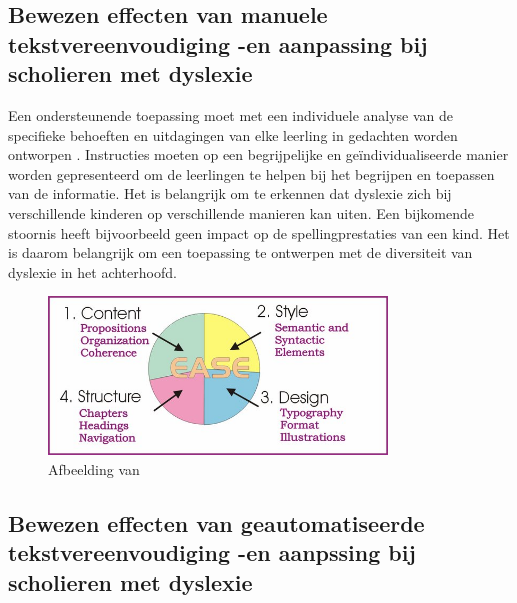 

\subsection{Bewezen effecten van manuele tekstvereenvoudiging -en aanpassing bij scholieren met dyslexie}

Een ondersteunende toepassing moet met een individuele analyse van de specifieke behoeften en uitdagingen van elke leerling in gedachten worden ontworpen \autocite{Gooding2022}. Instructies moeten op een begrijpelijke en geïndividualiseerde manier worden gepresenteerd om de leerlingen te helpen bij het begrijpen en toepassen van de informatie. Het is belangrijk om te erkennen dat dyslexie zich bij verschillende kinderen op verschillende manieren kan uiten. Een bijkomende stoornis heeft bijvoorbeeld geen impact op de spellingprestaties van een kind. Het is daarom belangrijk om een toepassing te ontwerpen met de diversiteit van dyslexie in het achterhoofd.


\begin{figure}[H]
	\begin{center}
		\includegraphics[width=9cm]{img/text-simplification-reading-ease.png}
	\end{center}
	\caption{Afbeelding van \textcite{Dubay2004}}
	\label{img:reading-ease}
\end{figure}


\subsection{Bewezen effecten van geautomatiseerde tekstvereenvoudiging -en aanpssing bij scholieren met dyslexie}